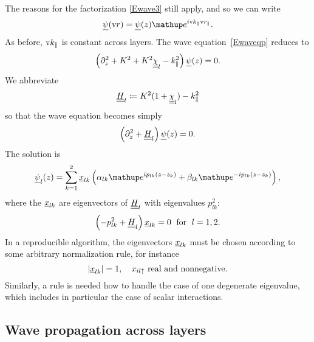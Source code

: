 The reasons for the factorization \cref{Ewave3} still apply,
and so we can write
\begin{equation}\label{Ewave3p}
\u\psi(\r) = \u\psi(z) \e^{i \k_\parallel\r_\parallel}.
\end{equation}
As before, $\text{v}{k}_\parallel$ is constant across layers.
The wave equation~\cref{Ewaveqp} reduces to
\begin{equation}\label{Ewavezp}
\left(\partial_z^2 + K^2 + K^2\underline{\underline{\chi}}_l - k_\parallel^2 \right) \underline{\psi}(z) = 0.
\end{equation}
We abbreviate
\begin{equation}
  \underline{\underline{H}}_l \coloneqq  K^2(1+\underline{\underline{\chi}}_l)-k_\parallel^2
\end{equation}
so that the wave equation becomes simply
\begin{equation}\label{Ewaveqp2}
  \left(\partial_z^2 + \underline{\underline{H}}_l\right) \underline{\psi}(z) = 0.
\end{equation}
The solution is
\begin{equation}\label{Epsizp}
  \u\psi_l(z)
  = \sum_{k=1}^2 \u x_{l k}\left(\alpha_{l k}\e^{i p_{l k}(z-z_k)}
                            + \beta_{l k}\e^{-i p_{l k}(z-z_k)}\right),
\end{equation}
where the $\underline{x}_{l k}$ are eigenvectors of $\underline{\underline{H}}_l$
with eigenvalues $p_{l k}^2$:
\begin{equation}
  \left( -p_{l k}^2 + \underline{\underline{H}}_l \right) \underline{x}_{l k} = 0
   \;\text{ for }\;l=1,2.
\end{equation}
In a reproducible algorithm,
the eigenvectors $\underline{x}_{l k}$ must be chosen according to some arbitrary
normalization rule,
for instance
\begin{equation}
  |\underline{x}_{l k}|=1,\quad x_{il\uparrow} \text{ real and nonnegative}.
\end{equation}
Similarly,
a rule is needed how to handle the case of one degenerate eigenvalue,
which includes in particular the case of scalar interactions.


\subsection{Wave propagation across layers}

